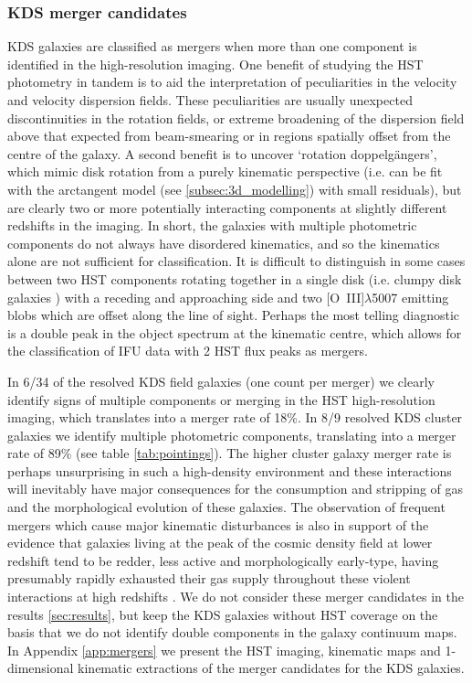 \documentclass[fleqn,usenatbib]{mn2e}
\begin{document}
\subsubsection{KDS merger candidates}\label{subsubsection:merger_candidates}
KDS galaxies are classified as mergers when more than one component is identified in the high-resolution imaging.  
One benefit of studying the HST photometry in tandem is to aid the interpretation of peculiarities in the velocity and velocity dispersion fields.
These peculiarities are usually unexpected discontinuities in the rotation fields, or extreme broadening of the dispersion field above that expected from beam-smearing or in regions spatially offset from the centre of the galaxy.
A second benefit is to uncover `rotation doppelg{\"a}ngers', which mimic disk rotation from a purely kinematic perspective (i.e. can be fit with the arctangent model (see \cref{subsec:3d_modelling}) with small residuals), but are clearly two or more potentially interacting components at slightly different redshifts in the imaging.
In short, the galaxies with multiple photometric components do not always have disordered kinematics, and so the kinematics alone are not sufficient for classification.
It is difficult to distinguish in some cases between two HST components rotating together in a single disk (i.e. clumpy disk galaxies \citep[e.g.][]{Elmegreen2004,Bournaud2007}) with a receding and approaching side and two [O~{\sc III}]$\lambda$5007 emitting blobs which are offset along the line of sight.
Perhaps the most telling diagnostic is a double peak in the object spectrum at the kinematic centre, which allows for the classification of IFU data with 2 HST flux peaks as mergers.

In 6/34 of the resolved KDS field galaxies (one count per merger) we clearly identify signs of multiple components or merging in the HST high-resolution imaging, which translates into a merger rate of 18\%.
In 8/9 resolved KDS cluster galaxies we identify multiple photometric components, translating into a merger rate of 89\%  (see table \ref{tab:pointings}).
The higher cluster galaxy merger rate is perhaps unsurprising in such a high-density environment and these interactions will inevitably have major consequences for the consumption and stripping of gas and the morphological evolution of these galaxies.
The observation of frequent mergers which cause major kinematic disturbances is also in support of the evidence that galaxies living at the peak of the cosmic density field at lower redshift tend to be redder, less active and morphologically early-type, having presumably rapidly exhausted their gas supply throughout these violent interactions at high redshifts \citep[e.g.][]{Steidel1998,White2007,Kodama2007,Zheng2009}.
We do not consider these merger candidates in the results \cref{sec:results}, but keep the KDS galaxies without HST coverage on the basis that we do not identify double components in the galaxy continuum maps. 
In Appendix \cref{app:mergers} we present the HST imaging, kinematic maps and 1-dimensional kinematic extractions of the merger candidates for the KDS galaxies.
\end{document}
